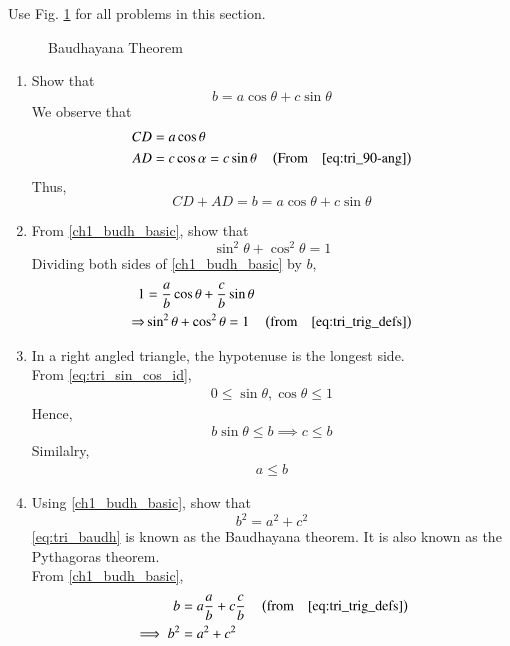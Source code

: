 Use Fig. \ref{fig:tri_baudh} for all problems in this section.
\begin{figure}[!ht]
	\begin{center}
		\resizebox{\columnwidth}{!}{}
	\end{center}
	\caption{Baudhayana Theorem}
	\label{fig:tri_baudh}	
\end{figure}
\renewcommand{\theequation}{\theenumi}
\begin{enumerate}[label=\thesection.\arabic*.,ref=\thesection.\theenumi]

%
\item
Show that 
%
\begin{equation}
\label{ch1_budh_basic}
b = a \cos \theta + c \sin \theta
\end{equation}
%
\solution We observe that
%
\begin{align}
CD &= a \cos \theta \\
AD &= c \cos\alpha = c \sin \theta \quad \left(\text{From} \quad \eqref{eq:tri_90-ang}
\right)
\end{align}
%
Thus,
\begin{equation}
CD + AD = b = a \cos \theta + c \sin \theta
\end{equation}
\item
From \eqref{ch1_budh_basic}, show that
%
\begin{equation}
%
\label{eq:tri_sin_cos_id}
\sin ^2 \theta + \cos ^2 \theta = 1
\end{equation}
%
\solution Dividing both sides of \eqref{ch1_budh_basic} by $b$, 
\begin{align}
1 &= \frac{a}{b}\cos\theta + \frac{c}{b}\sin\theta\\
\Rightarrow &\sin ^2 \theta + \cos ^2 \theta = 1 \quad \left(\text{from} \quad \eqref{eq:tri_trig_defs}\right)
\end{align}
\item In a right angled triangle, the hypotenuse is the longest side.
\label{them:hyp_largest}
\\
\solution From 
\eqref{eq:tri_sin_cos_id},
\begin{align}
	0 \le \sin \theta, \cos \theta \le 1
\end{align}
Hence, 
\begin{align}
	b \sin \theta \le b \implies  c \le b
\end{align}
Similalry,
\begin{align}
	a \le b
\end{align}

\item
	Using \eqref{ch1_budh_basic}, show that
	\begin{equation}
	\label{eq:tri_baudh}
	b^2 = a^2 + c^2
	\end{equation}
	\eqref{eq:tri_baudh} is known as the Baudhayana theorem.  It is also known as the Pythagoras theorem.
\\
\solution From \eqref{ch1_budh_basic},
\begin{align}
b &= a\frac{a}{b} + c \frac{c}{b} \quad \left(\text{from} \quad \eqref{eq:tri_trig_defs}\right)\\
\implies b^2 &= a^2 + c^2
\end{align}
\end{enumerate}
%
\iffalse
